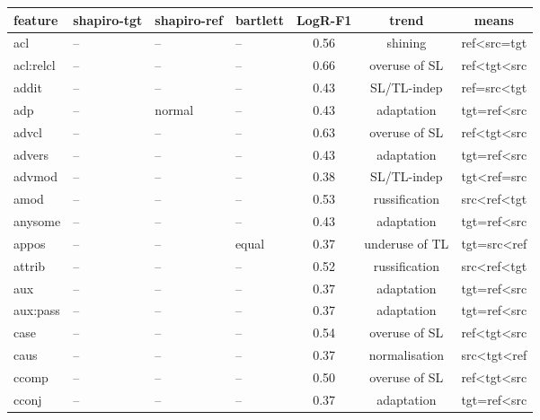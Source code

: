 \begin{longtable}{l|p{2cm}p{2cm}p{1.5cm}ccc}
	\toprule
	feature       & shapiro-tgt & shapiro-ref & bartlett & LogR-F1 & trend          & means \\
	\midrule
	acl           & --     & --     & --    & 0.56 & shining        & ref\textless{}src=tgt           \\
	acl:relcl     & --     & --     & --    & 0.66 & overuse of SL  & ref\textless{}tgt\textless{}src \\
	addit         & --     & --     & --    & 0.43 & SL/TL-indep    & ref=src\textless{}tgt           \\
	adp           & --     & normal & --    & 0.43 & adaptation     & tgt=ref\textless{}src           \\
	advcl         & --     & --     & --    & 0.63 & overuse of SL  & ref\textless{}tgt\textless{}src \\
	advers        & --     & --     & --    & 0.43 & adaptation     & tgt=ref\textless{}src           \\
	advmod        & --     & --     & --    & 0.38 & SL/TL-indep    & tgt\textless{}ref=src           \\
	amod          & --     & --     & --    & 0.53 & russification  & src\textless{}ref\textless{}tgt \\
	anysome       & --     & --     & --    & 0.43 & adaptation     & tgt=ref\textless{}src           \\
	appos         & --     & --     & equal & 0.37 & underuse of TL & tgt=src\textless{}ref           \\
	attrib        & --     & --     & --    & 0.52 & russification  & src\textless{}ref\textless{}tgt \\
	aux           & --     & --     & --    & 0.37 & adaptation     & tgt=ref\textless{}src           \\
	aux:pass      & --     & --     & --    & 0.37 & adaptation     & tgt=ref\textless{}src           \\
	case          & --     & --     & --    & 0.54 & overuse of SL  & ref\textless{}tgt\textless{}src \\
	caus          & --     & --     & --    & 0.37 & normalisation  & src\textless{}tgt\textless{}ref \\
	ccomp         & --     & --     & --    & 0.50 & overuse of SL  & ref\textless{}tgt\textless{}src \\
	cconj         & --     & --     & --    & 0.37 & adaptation     & tgt=ref\textless{}src           \\

\end{longtable}
